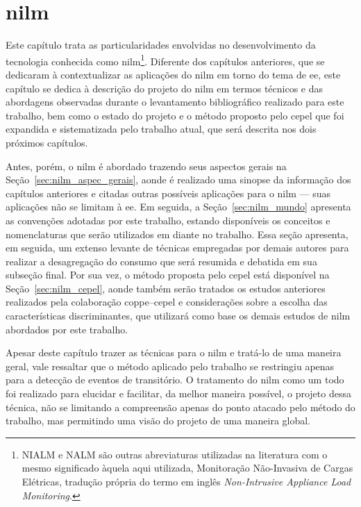 \chapter[Monitoração Não-Invasiva de Cargas Elétricas]{\acrfull{nilm}}
\label{cap:nilm}

Este capítulo trata as particularidades envolvidas no
desenvolvimento da tecnologia conhecida como \gls{nilm}\footnote{NIALM
e NALM são outras abreviaturas utilizadas na literatura com o mesmo
significado àquela aqui utilizada, Monitoração
Não-Invasiva de Cargas Elétricas, tradução própria do
termo em inglês \emph{Non-Intrusive Appliance Load Monitoring}.}.
Diferente dos capítulos anteriores, que
se dedicaram à contextualizar as aplicações do \acs{nilm} em torno do
tema de \acs{ee}, este capítulo se dedica à descrição do projeto do
\acs{nilm} em termos técnicos e das abordagens observadas
durante o levantamento bibliográfico realizado para este trabalho, bem
como o estado do projeto e o método proposto pelo \acs{cepel} que
foi expandida e sistematizada pelo trabalho atual, que será descrita
nos dois próximos capítulos.

Antes, porém, o \acs{nilm} é abordado trazendo seus aspectos gerais na
Seção~\ref{sec:nilm_aspec_gerais}, aonde é realizado uma sinopse da
informação dos capítulos anteriores e citadas outras possíveis
aplicações para o \acs{nilm} --- suas aplicações não se limitam à
\acs{ee}. Em seguida, a Seção~\ref{sec:nilm_mundo} apresenta as
convenções adotadas por este trabalho, estando disponíveis os
conceitos e nomenclaturas que serão utilizados em diante no trabalho.
Essa seção apresenta, em seguida, um extenso levante de técnicas
empregadas por demais autores para realizar a desagregação do consumo
que será resumida e debatida em sua subseção final.  Por sua vez, o
método proposta pelo \acs{cepel} está disponível na
Seção~\ref{sec:nilm_cepel}, aonde também serão tratados os estudos
anteriores realizados pela colaboração \acs{coppe}--\acs{cepel} e
considerações sobre a escolha das características discriminantes, que
utilizará como base os demais estudos de \acs{nilm} abordados por este
trabalho.

Apesar deste capítulo trazer as técnicas para o \acs{nilm} e tratá-lo
de uma maneira geral, vale ressaltar que o método aplicado pelo
trabalho se restringiu apenas para a detecção de eventos de
transitório. O tratamento do \acs{nilm} como um todo foi realizado
para elucidar e facilitar, da melhor maneira possível, o projeto dessa
técnica, não se limitando a compreensão apenas do ponto atacado pelo
método do trabalho, mas permitindo uma visão do projeto de uma
maneira global.


